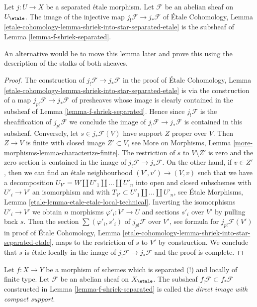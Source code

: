 \begin{lemma}
\label{lemma-separated-etale-shriek}
Let $j : U \to X$ be a separated \'etale morphism. Let $\mathcal{F}$
be an abelian sheaf on $U_\etale$. The image of the injective map
$j_!\mathcal{F} \to j_*\mathcal{F}$ of
\'Etale Cohomology, Lemma
\ref{etale-cohomology-lemma-shriek-into-star-separated-etale}
is the subsheaf of Lemma \ref{lemma-f-shriek-separated}.
\end{lemma}

\noindent
An alternative would be to move this lemma later and prove this
using the description of the stalks of both sheaves.

\begin{proof}
The construction of $j_!\mathcal{F} \to j_*\mathcal{F}$ in the proof of
\'Etale Cohomology, Lemma
\ref{etale-cohomology-lemma-shriek-into-star-separated-etale}
is via the construction of a map
$j_{p!}\mathcal{F} \to j_*\mathcal{F}$ of presheaves
whose image is clearly contained in the subsheaf of
Lemma \ref{lemma-f-shriek-separated}.
Hence since $j_!\mathcal{F}$ is the sheafification of
$j_{p!}\mathcal{F}$ we conclude the image of
$j_!\mathcal{F} \to j_*\mathcal{F}$ is contained in
this subsheaf. Conversely, let $s \in j_*\mathcal{F}(V)$
have support $Z$ proper over $V$. Then $Z \to V$ is
finite with closed image $Z' \subset V$, see
More on Morphisms, Lemma \ref{more-morphisms-lemma-characterize-finite}.
The restriction of $s$ to $V \setminus Z'$ is zero and the zero section is
contained in the image of $j_!\mathcal{F} \to j_*\mathcal{F}$.
On the other hand, if $v \in Z'$, then we can find
an \'etale neighbourhood
$(V', v') \to (V, v)$ such that we have a decomposition
$U_{V'} = W \amalg U'_1 \amalg \ldots \amalg U'_n$
into open and closed subschemes with $U'_i \to V'$ an isomorphism
and with $T_{V'} \subset U'_1 \amalg \ldots \amalg U'_n$, see
\'Etale Morphisms, Lemma \ref{etale-lemma-etale-etale-local-technical}.
Inverting the isomorphisms $U'_i \to V'$
we obtain $n$ morphisms $\varphi'_i : V' \to U$
and sections $s'_i$ over $V'$ by pulling back $s$.
Then the section $\sum (\varphi'_i, s'_i)$ of
$j_{p!}\mathcal{F}$ over $V'$, see formula for $j_{p!}\mathcal{F}(V')$
in proof of \'Etale Cohomology, Lemma
\ref{etale-cohomology-lemma-shriek-into-star-separated-etale},
maps to the restriction of $s$ to $V'$ by construction.
We conclude that $s$ is \'etale locally in the image
of $j_!\mathcal{F} \to j_*\mathcal{F}$ and the proof is complete.
\end{proof}

\begin{definition}
\label{definition-f-shriek-separated}
Let $f : X \to Y$ be a morphism of schemes which is separated (!) and
locally of finite type. Let $\mathcal{F}$ be an abelian sheaf on
$X_\etale$. The subsheaf $f_!\mathcal{F} \subset f_*\mathcal{F}$
constructed in Lemma \ref{lemma-f-shriek-separated} is called the
{\it direct image with compact support}.
\end{definition}

